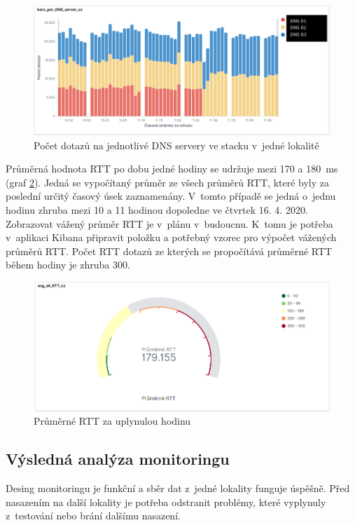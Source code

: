\documentclass[thesis=M,czech]{src/FITthesis}[2019/12/23]
\begin{document}
\begin{figure}[ht]
  \centering
   \includegraphics[width=1\textwidth]{images/queries-per-dns.png}
   \caption{Počet dotazů na jednotlivé DNS servery ve stacku v~jedné lokalitě}
     \label{fig:queries-per-dns}
\end{figure}

Průměrná hodnota RTT po dobu jedné hodiny se udržuje mezi 170 a 180~ms (graf \ref{fig:rtt-avg}). Jedná se vypočítaný průměr ze všech průměrů RTT, které byly za poslední určitý časový úsek zaznamenány. V~tomto případě se jedná o~jednu hodinu zhruba mezi 10 a 11 hodinou dopoledne ve čtvrtek 16. 4. 2020. Zobrazovat vážený průměr RTT je v~plánu v~budoucnu. K~tomu je potřeba v~aplikaci Kibana připravit položku a potřebný vzorec pro výpočet vážených průměrů RTT. Počet RTT dotazů ze kterých se propočítává průměrné RTT během hodiny je zhruba 300.

\begin{figure}[ht]
  \centering
   \includegraphics[width=1\textwidth]{images/rtt-avg.png}
   \caption{Průměrné RTT za uplynulou hodinu}
     \label{fig:rtt-avg}
\end{figure}

\subsection{Výsledná analýza monitoringu}
Desing monitoringu je funkční a sběr dat z~jedné lokality funguje úspěšně. Před nasazením na další lokality je potřeba odstranit problémy, které vyplynuly z~testování nebo brání dalšímu nasazení. 
\end{document}
